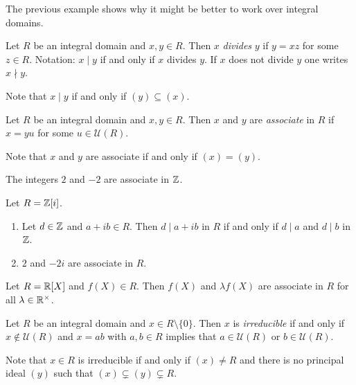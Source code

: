 The previous example shows why it might be better 
to work over integral domains. 

\begin{definition}
	Let $R$ be an integral domain and $x,y\in R$. Then $x$ \emph{divides} $y$ 
	if $y=xz$ for some $z\in R$. 
	Notation: $x\mid y$ if and only if $x$ divides $y$. If $x$ does not
	divide $y$ one writes $x\nmid y$.  
\end{definition}

Note that $x\mid y$ if and only if $(y)\subseteq (x)$.
	
\begin{definition}
	Let $R$ be an integral domain and $x,y\in R$. Then $x$ and $y$ are
	\emph{associate} in $R$ if $x=yu$ for some $u\in\mathcal{U}(R)$. 
\end{definition}

Note that $x$ and $y$ are associate if and only if $(x)=(y)$.

\begin{example}
	The integers $2$ and $-2$ are associate in $\mathbb{Z}$.	
\end{example}

\begin{example}
	Let $R=\mathbb{Z}[i]$. 
	\begin{enumerate}
		\item Let $d\in\mathbb{Z}$ and $a+ib\in R$. Then $d\mid a+ib$ in $R$ if and only if 
			$d\mid a$ and $d\mid b$ in $\mathbb{Z}$. 
		\item $2$ and $-2i$ are associate in $R$.
	\end{enumerate} 	
\end{example}

\begin{example}
	Let $R=\mathbb{R}[X]$ and $f(X)\in R$. Then $f(X)$ and $\lambda f(X)$ are 
	associate in $R$ for all $\lambda\in\mathbb{R}^{\times}$. 	
\end{example}

\begin{definition}
	Let $R$ be an integral domain and $x\in R\setminus\{0\}$. Then $x$ is \emph{irreducible} 
	if and only if $x\not\in\mathcal{U}(R)$ 
	and $x=ab$ with $a,b\in R$ implies that $a\in\mathcal{U}(R)$ or $b\in\mathcal{U}(R)$. 
\end{definition}

Note that $x\in R$ is irreducible if and only if $(x)\ne R$ 
and there is no principal ideal $(y)$ such that 
$(x)\subsetneq (y)\subsetneq R$.

